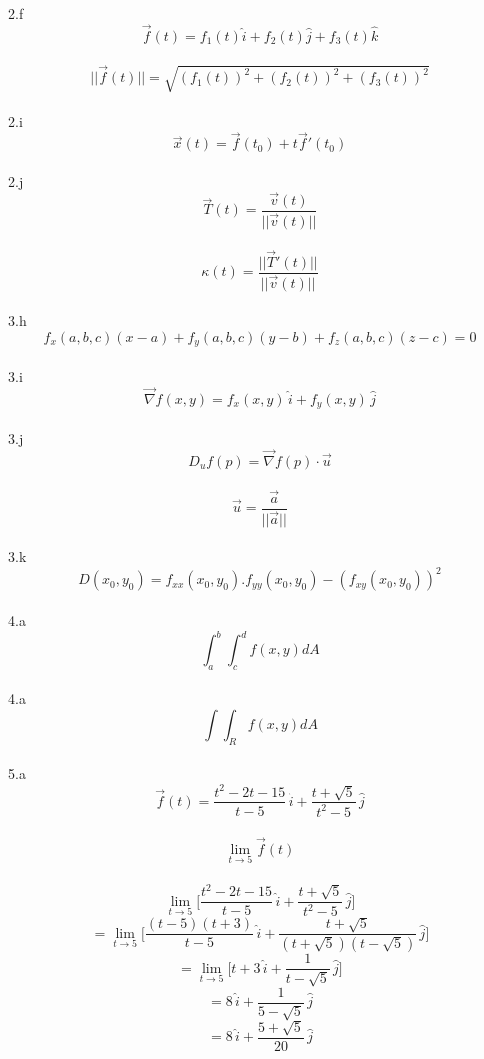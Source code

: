 \documentclass{article}
\begin{document}
    2.f \\
    $$\vec f(t) = f_1(t) \hat i + f_2(t) \hat j + f_3(t) \hat k$$ \\
    $$||\vec f(t)|| = \sqrt{(f_1(t))^2 + (f_2(t))^2 + (f_3(t))^2}$$ \\

    2.i \\
    $$\vec x (t) = \vec f(t_0) + t \vec f'(t_0)$$ \\

    2.j\\
    $$\vec T(t) = \frac{\vec v(t)}{||\vec v(t)||}$$\\
    $$\kappa (t) = \frac{||\vec T'(t)||}{||\vec v(t)||}$$\\

    3.h \\
    $$f_x(a, b, c)(x - a) + f_y(a, b, c)(y - b) + f_z(a, b, c)(z - c) = 0$$\\

    3.i \\
    $$\vec \nabla f(x, y) = f_x(x, y)  \, \hat i + f_y(x, y) \, \hat j$$ \\

    3.j \\
    $$D_uf(p) = \vec \nabla f(p) \cdot \vec u$$\\
    $$\vec u = \frac{\vec a}{||\vec a||}$$ \\

    3.k \\
    $$D(x_0, y_0) = f_{xx}(x_0, y_0) . f_{yy}(x_0, y_0) - (f_{xy}(x_0, y_0))^2$$\\

    4.a \\
    $$\int _a ^b \int _c ^d f(x, y) dA$$ \\

    4.a \\
    $$\int \int _R f(x, y) dA$$ \\

    5.a \\
    $$\vec f(t) = \frac{t^2 - 2t - 15}{t- 5} \, \hat i + \frac{t + \sqrt 5}{t^2 - 5} \, \hat j$$\\
    $$\lim_{t \to 5} \vec f(t)$$\\
    $$\lim_{t \to 5} \biggr [\frac{t^2 - 2t - 15}{t- 5} \, \hat i + \frac{t + \sqrt 5}{t^2 - 5} \, \hat j \biggr ]$$
    $$= \lim_{t \to 5} \biggr [\frac{(t - 5)(t + 3)}{t- 5} \, \hat i + \frac{t + \sqrt 5}{(t + \sqrt 5)(t - \sqrt 5)} \, \hat j \biggr ]$$
    $$= \lim_{t \to 5} \biggr [t + 3 \, \hat i + \frac{1}{t - \sqrt 5} \, \hat j \biggr ]$$
    $$=  8 \, \hat i + \frac{1}{5 - \sqrt 5} \, \hat j $$
    $$=  8 \, \hat i + \frac{5 + \sqrt 5}{20} \, \hat j $$
\end{document}
